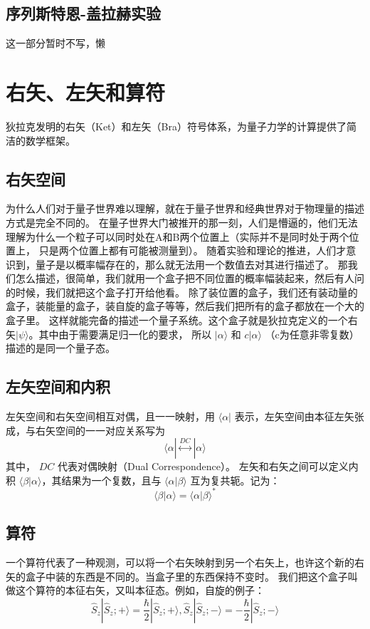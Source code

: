 \documentclass{book}
\begin{document}
\subsection{序列斯特恩-盖拉赫实验}
这一部分暂时不写，懒~

\section{右矢、左矢和算符}
狄拉克发明的右矢（Ket）和左矢（Bra）符号体系，为量子力学的计算提供了简洁的数学框架。 
\subsection{右矢空间}
为什么人们对于量子世界难以理解，就在于量子世界和经典世界对于物理量的描述方式是完全不同的。
在量子世界大门被推开的那一刻，人们是懵逼的，他们无法理解为什么一个粒子可以同时处在A和B两个位置上（实际并不是同时处于两个位置上，
只是两个位置上都有可能被测量到）。
随着实验和理论的推进，人们才意识到，量子是以概率幅存在的，那么就无法用一个数值去对其进行描述了。
那我们怎么描述，很简单，我们就用一个盒子把不同位置的概率幅装起来，然后有人问的时候，我们就把这个盒子打开给他看。
除了装位置的盒子，我们还有装动量的盒子，装能量的盒子，装自旋的盒子等等，然后我们把所有的盒子都放在一个大的盒子里。
这样就能完备的描述一个量子系统。这个盒子就是狄拉克定义的一个右矢$|\psi\rangle$。其中由于需要满足归一化的要求，
所以 $|\alpha\rangle$ 和 $c|\alpha\rangle$ （c为任意非零复数）描述的是同一个量子态。

\subsection{左矢空间和内积}
左矢空间和右矢空间相互对偶，且一一映射，用 $\langle \alpha |$ 表示，左矢空间由本征左矢张成，与右矢空间的一一对应关系写为
\begin{equation}
    \langle \alpha| \overset{DC}{\longleftrightarrow } |\alpha\rangle
    \label{eq:1.4} 
\end{equation}
其中， $DC$ 代表对偶映射（Dual Correspondence）。
左矢和右矢之间可以定义内积 $\langle \beta | \alpha \rangle$，其结果为一个复数，且与 $\langle \alpha | \beta \rangle$ 互为复共轭。记为：
\begin{equation}
    \langle \beta | \alpha \rangle = \langle \alpha | \beta \rangle^*
    \label{eq:1.5} 
\end{equation}

\subsection{算符}
一个算符代表了一种观测，可以将一个右矢映射到另一个右矢上，也许这个新的右矢的盒子中装的东西是不同的。当盒子里的东西保持不变时。
我们把这个盒子叫做这个算符的本征右矢，又叫本征态。例如，自旋的例子：
\begin{equation}
    \hat{S}_z |\hat{S}_z; +\rangle = \frac{\hbar}{2} |\hat{S}_z; +\rangle, 
    \hat{S}_z |\hat{S}_z; -\rangle = -\frac{\hbar}{2} |\hat{S}_z; -\rangle
    \label{eq:1.3}
\end{equation}
\end{document}
